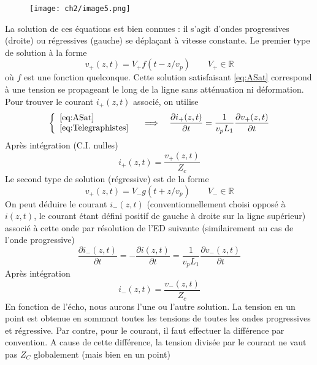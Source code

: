 \begin{figure}
	\vspace{-5mm}
	\texttt{[image: ch2/image5.png]}
\end{figure}
La solution de ces équations est bien connues : il s'agit d'ondes progressives (droite) ou 
régressives (gauche) se déplaçant à vitesse constante. Le premier type de solution à la 
forme
\begin{equation}
v_+(z,t) = V_+f(t-z/v_p)\qquad V_+\in\mathbb{R}
\end{equation}
où $f$ est une fonction quelconque. Cette solution satisfaisant \autoref{eq:ASat} correspond 
à une tension se propageant le long de la ligne sans atténuation ni déformation. Pour trouver 
le courant $i_+(z,t)$ associé, on utilise
\begin{equation}
\left\{\begin{array}{l}
\autoref{eq:ASat}\\
\autoref{eq:Telegraphistes}
\end{array}\right.\quad\Longrightarrow\quad \dfrac{\partial i_+(z,t)}{\partial t} = 
\dfrac{1}{v_pL_1}\dfrac{\partial v_+(z,t)}{\partial t}
\end{equation}
Après intégration (C.I. nulles)
\begin{equation}
i_+(z,t) = \dfrac{v_+(z,t)}{Z_c}
\end{equation}
Le second type de solution (régressive) est de la forme
\begin{equation}
v_+(z,t) = V_-g(t+z/v_p)\qquad V_-\in\mathbb{R}
\end{equation}
On peut déduire le courant $i_-(z,t)$ (conventionnellement choisi opposé à $i(z,t)$, 
le courant étant défini positif de gauche à droite sur la ligne supérieur) associé à 
cette onde par résolution de l'ED suivante (similairement au cas de l'onde progressive)
\begin{equation}
\dfrac{\partial i_-(z,t)}{\partial t} = -
\dfrac{\partial i(z,t)}{\partial t} = \dfrac{1}{v_pL_1}\dfrac{\partial v_-(z,t)}{\partial t}
\end{equation}
Après intégration
\begin{equation}
i_-(z,t) = \dfrac{v_-(z,t)}{Z_c}
\end{equation}
En fonction de l'écho, nous aurons l'une ou l'autre solution. La tension en un point est 
obtenue en sommant toutes les tensions de toutes les ondes progressives et régressive. Par 
contre, pour le courant, il faut effectuer la différence par convention. A cause de cette 
différence, la tension divisée par le courant ne vaut pas $Z_C$ globalement (mais bien en 
un point)


